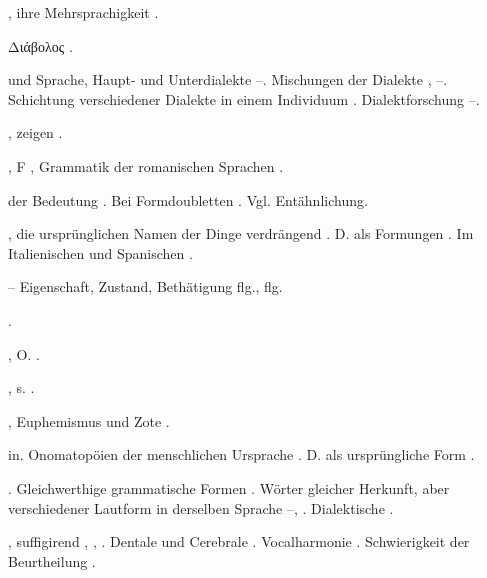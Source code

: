 \begin{register}
, ihre Mehrsprachigkeit \pageref{sp.70}.


Διάβολος \pageref{sp.230}.

 und Sprache, Haupt- und Unterdialekte \pageref{sp.54}–\pageref{sp.58}. Mischungen der Dialekte \pageref{sp.177}, \pageref{sp.273}–\pageref{sp.277}. Schichtung verschiedener Dialekte in einem Individuum \pageref{sp.269}. Dialektforschung \pageref{sp.283}–\pageref{sp.287}.

, zeigen \pageref{sp.163}.


, F , Grammatik der romanischen Sprachen \pageref{sp.173}.

 der Bedeutung \pageref{sp.100}. Bei Formdoubletten \pageref{sp.254}. Vgl. Entähnlichung.

, die ursprünglichen Namen der Dinge verdrängend \pageref{sp.242}. D. als Formungen \pageref{sp.324}. Im Italienischen und Spanischen \pageref{sp.445}.

 – Eigenschaft, Zustand, Bethätigung \pageref{sp.381} flg., \pageref{sp.453} flg.

 \pageref{sp.282}.

, O. \pageref{sp.294}.

, s. .

, Euphemismus und Zote \pageref{sp.248}.

 in. Onomatopöien der menschlichen Ursprache \pageref{sp.255}\sed{, \pageref{sp.314}}. D. als ursprüngliche Form \pageref{sp.326}.

.  Gleichwerthige grammatische Formen \pageref{sp.254}. Wörter gleicher Herkunft, aber verschiedener Lautform in derselben Sprache \pageref{sp.266}–\pageref{sp.267}, \pageref{sp.276}. Dialektische \pageref{sp.285}.

, suffigirend \inlineupdate{\pageref{sp.29};}{\pageref{sp.29},} \pageref{sp.142}, \pageref{sp.149}, \pageref{sp.349}. Dentale und Cerebrale \pageref{sp.269}.  Vocalharmonie \pageref{sp.402}. Schwierigkeit der Beurtheilung \sed{\pageref{sp.281},} \pageref{sp.426}.


\end{register}
